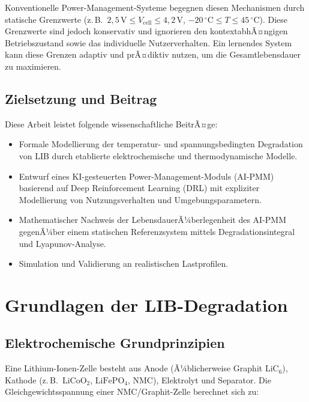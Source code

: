 ﻿\documentclass[12pt,a4paper]{article}
\begin{document}
	Konventionelle Power-Management-Systeme begegnen diesen Mechanismen durch statische
	Grenzwerte (z.\,B.\ $2{,}5\,\mathrm{V} \leq V_\mathrm{cell} \leq 4{,}2\,\mathrm{V}$,
	$-20\,^\circ\mathrm{C} \leq T \leq 45\,^\circ\mathrm{C}$). Diese Grenzwerte sind
	jedoch konservativ und ignorieren den kontextabhÃ¤ngigen Betriebszustand sowie
	das individuelle Nutzerverhalten. Ein lernendes System kann diese Grenzen
	adaptiv und prÃ¤diktiv nutzen, um die Gesamtlebensdauer zu maximieren.
	
	\subsection{Zielsetzung und Beitrag}
	
	Diese Arbeit leistet folgende wissenschaftliche BeitrÃ¤ge:
	
	\begin{itemize}[leftmargin=*]
		\item Formale Modellierung der temperatur- und spannungsbedingten Degradation
		von LIB durch etablierte elektrochemische und thermodynamische Modelle.
		\item Entwurf eines KI-gesteuerten Power-Management-Moduls (AI-PMM) basierend
		auf Deep Reinforcement Learning (DRL) mit expliziter Modellierung von Nutzungsverhalten
		und Umgebungsparametern.
		\item Mathematischer Nachweis der LebensdauerÃ¼berlegenheit des AI-PMM gegenÃ¼ber
		einem statischen Referenzsystem mittels Degradationsintegral und Lyapunov-Analyse.
		\item Simulation und Validierung an realistischen Lastprofilen.
	\end{itemize}
	
	\section{Grundlagen der LIB-Degradation}
	\label{sec:grundlagen}
	
	\subsection{Elektrochemische Grundprinzipien}
	
	Eine Lithium-Ionen-Zelle besteht aus Anode (Ã¼blicherweise Graphit $\mathrm{LiC_6}$),
	Kathode (z.\,B.\ $\mathrm{LiCoO_2}$, $\mathrm{LiFePO_4}$, NMC), Elektrolyt
	und Separator. Die Gleichgewichtsspannung einer NMC/Graphit-Zelle berechnet sich
	zu:
	
\end{document}
